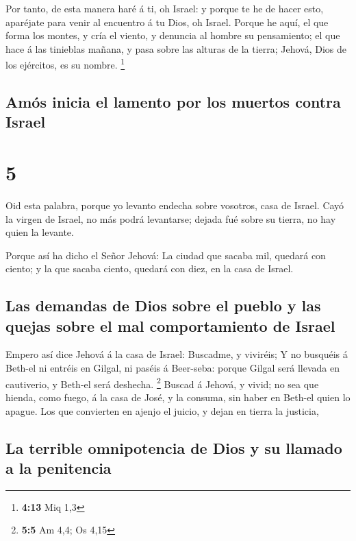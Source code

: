  Por tanto, de esta manera haré á ti, oh Israel: y porque
te he de hacer esto, aparéjate para venir al encuentro á tu Dios, oh
Israel.  Porque he aquí, el que forma los montes, y cría el
viento, y denuncia al hombre su pensamiento; el que hace á las tinieblas
mañana, y pasa sobre las alturas de la tierra; Jehová, Dios de los
ejércitos, es su nombre. \footnote{\textbf{4:13} Miq 1,3}

\hypertarget{amuxf3s-inicia-el-lamento-por-los-muertos-contra-israel}{%
\subsection{Amós inicia el lamento por los muertos contra
Israel}\label{amuxf3s-inicia-el-lamento-por-los-muertos-contra-israel}}

\hypertarget{section-4}{%
\section{5}\label{section-4}}

 Oid esta palabra, porque yo levanto endecha sobre vosotros,
casa de Israel.  Cayó la virgen de Israel, no más podrá
levantarse; dejada fué sobre su tierra, no hay quien la levante.

 Porque así ha dicho el Señor Jehová: La ciudad que sacaba
mil, quedará con ciento; y la que sacaba ciento, quedará con diez, en la
casa de Israel.

\hypertarget{las-demandas-de-dios-sobre-el-pueblo-y-las-quejas-sobre-el-mal-comportamiento-de-israel}{%
\subsection{Las demandas de Dios sobre el pueblo y las quejas sobre el
mal comportamiento de
Israel}\label{las-demandas-de-dios-sobre-el-pueblo-y-las-quejas-sobre-el-mal-comportamiento-de-israel}}

 Empero así dice Jehová á la casa de Israel: Buscadme, y
viviréis;  Y no busquéis á Beth-el ni entréis en Gilgal, ni
paséis á Beer-seba: porque Gilgal será llevada en cautiverio, y Beth-el
será deshecha. \footnote{\textbf{5:5} Am 4,4; Os 4,15} 
Buscad á Jehová, y vivid; no sea que hienda, como fuego, á la casa de
José, y la consuma, sin haber en Beth-el quien lo apague. 
Los que convierten en ajenjo el juicio, y dejan en tierra la justicia,

\hypertarget{la-terrible-omnipotencia-de-dios-y-su-llamado-a-la-penitencia}{%
\subsection{La terrible omnipotencia de Dios y su llamado a la
penitencia}\label{la-terrible-omnipotencia-de-dios-y-su-llamado-a-la-penitencia}}

